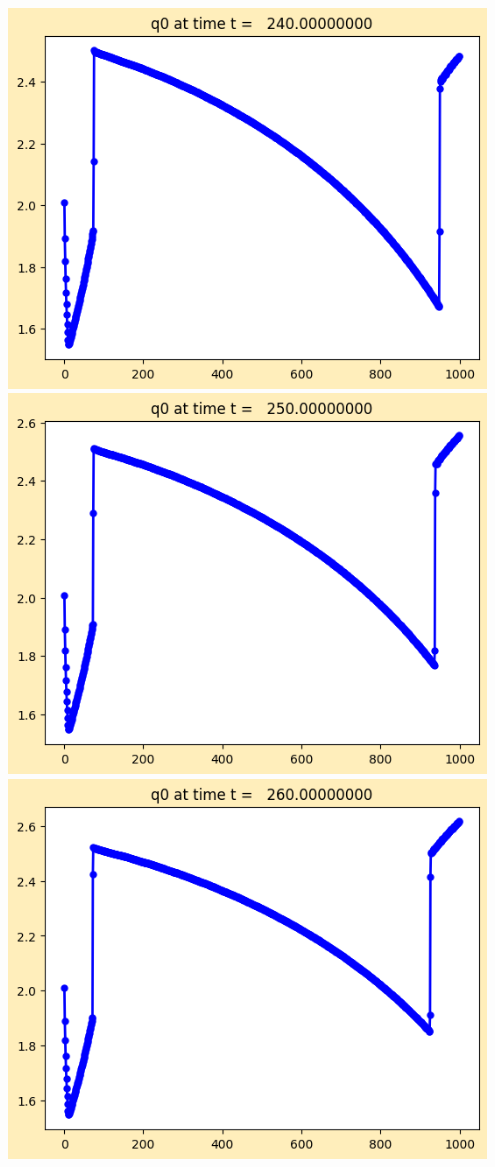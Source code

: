 \documentclass[11pt]{article}
\begin{document}
\vskip 10pt 
\includegraphics[width=0.95\textwidth]{frame0024fig1.png}
\vskip 10pt 
\includegraphics[width=0.95\textwidth]{frame0025fig1.png}
\vskip 10pt 
\includegraphics[width=0.95\textwidth]{frame0026fig1.png}
\end{document}
